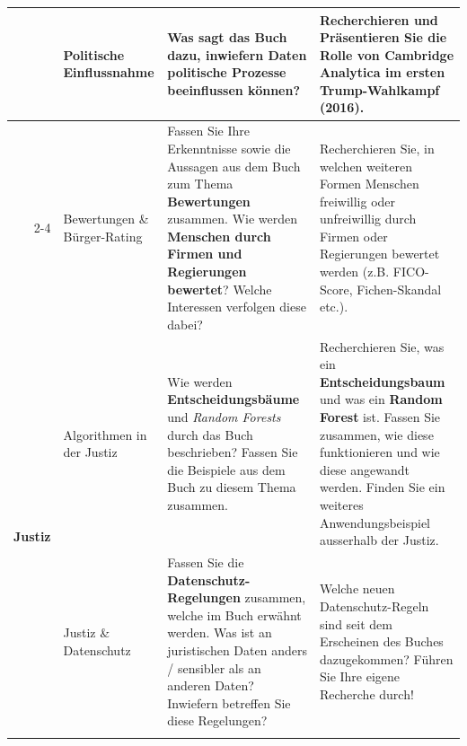 \begin{landscape}
\begin{longtable}{@{}r|p{5.3cm}||p{10cm}|p{10cm}@{}}
		                              & Politische Einflussnahme              & Was sagt das Buch dazu, inwiefern Daten \textbf{politische Prozesse beeinflussen} können?                                                                                                                                                                                                                                                                                            & Recherchieren und Präsentieren Sie die Rolle von Cambridge Analytica im ersten Trump-Wahlkampf (2016).                                                                                                                                                                           \\\cmidrule(l){2-4}
		                              & Bewertungen \& Bürger-Rating          & Fassen Sie Ihre Erkenntnisse sowie die Aussagen aus dem Buch zum Thema \textbf{Bewertungen} zusammen. Wie werden \textbf{Menschen durch Firmen und Regierungen bewertet}? Welche Interessen verfolgen diese dabei?                                                                                                                                                                            & Recherchieren Sie, in welchen weiteren Formen Menschen freiwillig oder unfreiwillig durch Firmen oder Regierungen bewertet werden (z.B. FICO-Score, Fichen-Skandal etc.).                                                                                                        \\\midrule\midrule
		\multirow{4}{*}{\textbf{Justiz}}       & Algorithmen in der Justiz             & Wie werden \textbf{Entscheidungsbäume} und \textit{Random Forests} durch das Buch beschrieben? Fassen Sie die Beispiele aus dem Buch zu diesem Thema zusammen.                                                                                                                                                                                                                       & Recherchieren Sie, was ein \textbf{Entscheidungsbaum} und was ein \textbf{Random Forest} ist. Fassen Sie zusammen, wie diese funktionieren und wie diese angewandt werden. Finden Sie ein weiteres Anwendungsbeispiel ausserhalb der Justiz.                                                       \\\cmidrule(l){2-4}
		                              & Justiz \& Datenschutz                 & Fassen Sie die \textbf{Datenschutz-Regelungen} zusammen, welche im Buch erwähnt werden. Was ist an juristischen Daten anders / sensibler als an anderen Daten? Inwiefern betreffen Sie diese Regelungen?                                                                                                                                                                             & Welche neuen Datenschutz-Regeln sind seit dem Erscheinen des Buches dazugekommen? Führen Sie Ihre eigene Recherche durch!                                                                                                                                                        \\\cmidrule(l){2-4}

\end{longtable}
\end{landscape}
